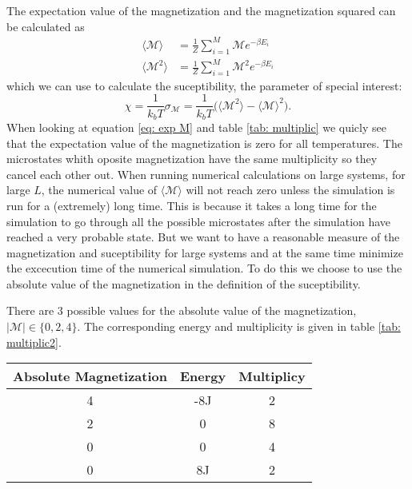 \documentclass[11pt,a4wide]{article}
\begin{document}
The expectation value of the magnetization and the magnetization squared can be calculated as
\begin{align}
\langle \mathcal{M} \rangle &= \frac{1}{Z}\sum_{i=1}^M \mathcal{M}  e^{-\beta E_i} \label{eq: exp M} \\
\langle \mathcal{M}^2 \rangle &= \frac{1}{Z}\sum_{i=1}^M \mathcal{M}^2  e^{-\beta E_i} \nonumber
\end{align}
which we can use to calculate the suceptibility, the parameter of special interest: 
\[
\chi = \frac{1}{k_bT}\sigma_\mathcal{M} = \frac{1}{k_bT}\big( \langle \mathcal{M}^2 \rangle - \langle \mathcal{M} \rangle^2 \big).
\]
When looking at equation \ref{eq: exp M} and table \ref{tab: multiplic} we quicly see that the expectation value of the magnetization is zero for all temperatures. The microstates whith oposite magnetization have the same multiplicity so they cancel each other out. When running numerical calculations on large systems, for large $L$, the numerical value of $\langle \mathcal{M} \rangle$ will not reach zero unless the simulation is run for a (extremely) long time. This is because it takes a long time for the simulation to go through all the possible microstates after the simulation have reached a very probable state. But we want to have a reasonable measure of the magnetization and suceptibility for large systems and at the same time minimize the excecution time of the numerical simulation. To do this we choose to use the absolute value of the magnetization in the definition of the suceptibility. 

There are 3 possible values for the absolute value of the magnetization, $|\mathcal{M}| \in \{0, 2, 4\}$.  The corresponding energy and multiplicity is given in table \ref{tab: multiplic2}. 

\begin{tabular}{|c|c|c|}
\hline 
Absolute Magnetization & Energy &  Multiplicy\\ 
\hline 
4 & -8J & 2 \\ 
\hline 
2 & 0 & 8 \\ 
\hline 
0 & 0 & 4 \\ 
\hline 
0 & 8J & 2 \\ 
\hline 
\end{tabular} \label{tab: multiplic2}
\end{document}
